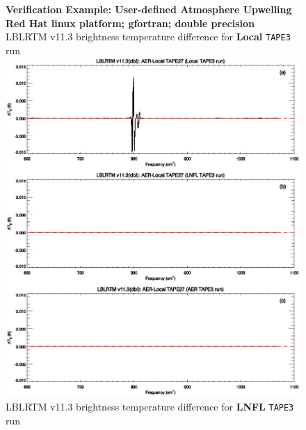 \begin{figure}[htp]
  \centering
  \qquad\sffamily\textbf{Verification Example: User-defined Atmosphere Upwelling}\\
  \qquad\sffamily\textbf{Red Hat linux platform; gfortran; double precision}\\
  \qquad\textsf{LBLRTM v11.3 brightness temperature difference for \textbf{Local} \texttt{TAPE3} run}\\
  \includegraphics[bb=82 490 534 648,clip,scale=1.0]{graphics/run_example_user_defined_upwelling/gfortran/dbl.eps}
  \qquad\textsf{LBLRTM v11.3 brightness temperature difference for \textbf{LNFL} \texttt{TAPE3} run}\\

\end{figure}
